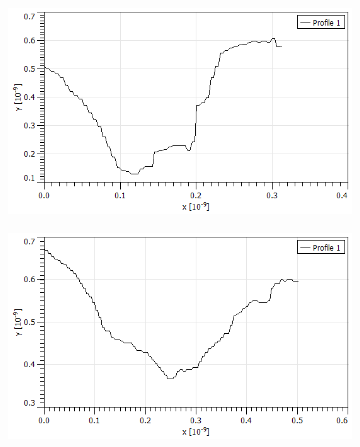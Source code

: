 \begin{figure}[]
    \centering
    \begin{subfigure}{.475\linewidth}
        \includegraphics[width=\linewidth]{Messdaten/Hoehenprofil_anderes/1.png}
      \end{subfigure}\hfill 
      \begin{subfigure}{.475\linewidth}
        \includegraphics[width=\linewidth]{Messdaten/Hoehenprofil_anderes/2.png}
      \end{subfigure}
      \medskip 


\end{figure}
